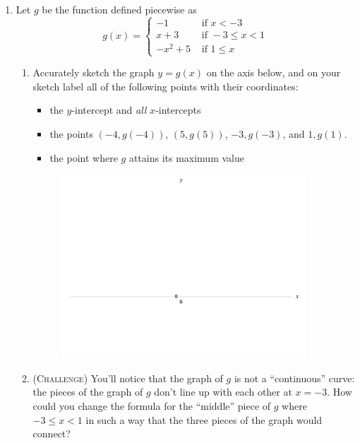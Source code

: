 \begin{enumerate}
    \item 
        Let \(g\) be the function defined piecewise as 
        \begin{equation*}
            g(x) = \begin{cases} 
                -1 &\text{ if } x < -3
                \\ x + 3 &\text{ if } -3 \leq x < 1
                \\-x^2+5 &\text{ if } 1 \leq x
            \end{cases}
        \end{equation*}
        \begin{enumerate}
            \item 
                Accurately sketch the graph \(y = g(x)\) 
                on the axis below,
                and on your sketch label all of the following
                points with their coordinates:
                \begin{itemize}\setlength\itemsep{-1em}
                    \item the \(y\)-intercept and \emph{all} \(x\)-intercepts
                    \item the points \((-4,g(-4))\), \((5,g(5))\), \(-3, g(-3)\), and \(1, g(1)\).
                    \item the point where \(g\) attains its maximum value
                \end{itemize}
            \begin{figure}[h]
                \centering\includegraphics[width=0.92\textwidth]{figures/blank/main.pdf}
            \end{figure}
            \item (\textsc{Challenge})
                You'll notice that the graph of \(g\) 
                is not a ``continuous'' curve:
                the pieces of the graph of \(g\)
                don't line up with each other at \(x=-3\).
                How could you change the formula
                for the ``middle'' piece of \(g\) where
                \(-3 \leq x < 1\) in such a way that 
                the three pieces of the graph would connect?
        \end{enumerate}

\end{enumerate}



